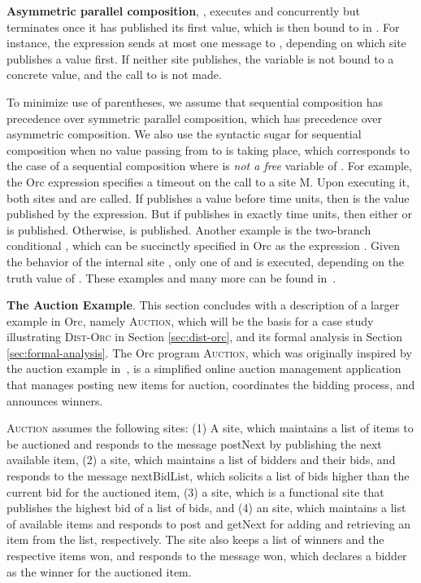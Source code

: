 \documentclass{eptcs}
\begin{document}
\textbf{Asymmetric parallel composition}, , executes  and  concurrently but terminates  once it has published its first value, which is then bound to  in . For instance, the expression  sends at most one message to , depending on which site publishes a value first. If neither site publishes, the variable  is not bound to a concrete value, and the call to  is not made.




To minimize use of parentheses, we assume that sequential composition has precedence over symmetric parallel composition, which has precedence over asymmetric composition. We also use the syntactic sugar  for sequential composition when no value passing from  to  is taking place, which corresponds to the case of a sequential composition  where  is \emph{not a free} variable of . For example, the Orc expression  specifies a timeout on the call to a site M. 
Upon executing it, both sites  and  are called. If  publishes a value  before  time units, then  is the value published by the expression. But if  publishes  in exactly  time units, then either  or  is published. Otherwise,  is published.
Another example is the two-branch conditional , which can be succinctly specified in Orc as the expression . 
Given the behavior of the internal site , only one of  and  is executed, depending on the truth value of . 
These examples and many more can be found in~\cite{OrcTheory05}.

\textbf{The Auction Example}. This section concludes with a description of a larger example in Orc, namely \textsc{Auction}, which will be the basis for a case study illustrating \textsc{Dist-Orc} in Section \ref{sec:dist-orc}, and its formal analysis in Section \ref{sec:formal-analysis}.
The Orc program \textsc{Auction}, which was originally inspired by the auction example in~\cite{OrcTheory05}, is a simplified online auction management application that manages posting new items for auction, coordinates the bidding process, and announces winners. 

\textsc{Auction} assumes the following sites: (1) A  site, which maintains a list of items to be auctioned and responds to the message \textsf{postNext} by publishing the next available item, (2) a  site, which maintains a list of bidders and their bids, and responds to the message \textsf{nextBidList},  which solicits a list of bids higher than the current bid for the auctioned item, (3) a  site, which is a functional site that publishes the highest bid of a list of bids, and (4) an  site, which maintains a list of available items and responds to \textsf{post} and \textsf{getNext} for adding and retrieving an item from the list, respectively. The  site also keeps a list of winners and the respective items won, and responds to the message \textsf{won}, which declares a bidder as the winner for the auctioned item.
\end{document}
